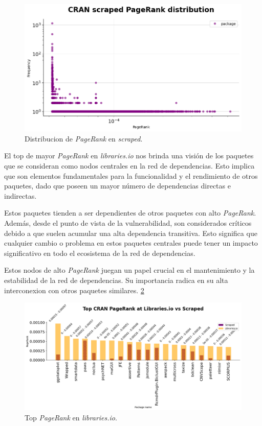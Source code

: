 \begin{figure}[h!]
    \begin{center}
        \includegraphics[width=1\textwidth]{img/cran/pr2.png}
        \caption{Distribucion de \textit{PageRank} en \textit{scraped}.}
        \label{fig:cran_pr_scraped}
    \end{center}
\end{figure}

El top de mayor \textit{PageRank} en \textit{libraries.io} nos brinda una visión de los paquetes que se
consideran como nodos centrales en la red de dependencias. Esto implica que son elementos fundamentales
para la funcionalidad y el rendimiento de otros paquetes, dado que poseen un mayor número de dependencias
directas e indirectas.

Estos paquetes tienden a ser dependientes de otros paquetes con alto \textit{PageRank}. Además, desde el
punto de vista de la vulnerabilidad, son considerados críticos debido a que suelen acumular una alta
dependencia transitiva. Esto significa que cualquier cambio o problema en estos paquetes centrales puede
tener un impacto significativo en todo el ecosistema de la red de dependencias.

Estos nodos de alto \textit{PageRank} juegan un papel crucial en el mantenimiento y la estabilidad de la
red de dependencias. Su importancia radica en su alta interconexion con otros paquetes similares. \ref{fig:cran_pr_libio_top}

\begin{figure}[h!]
    \begin{center}
        \includegraphics[width=1\textwidth]{img/cran/pr_top.png}
        \caption{Top \textit{PageRank} en \textit{libraries.io}.}
        \label{fig:cran_pr_libio_top}
    \end{center}
\end{figure}



